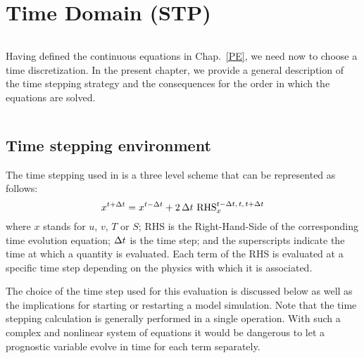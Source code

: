 \documentclass[NEMO_book]{subfiles}
\begin{document}
\chapter{Time Domain (STP) }
\label{STP}
\minitoc





\newpage
$\ $\newline    %


Having defined the continuous equations in Chap.~\ref{PE}, we need now to choose 
a time discretization. In the present chapter, we provide a general description of the \NEMO 
time stepping strategy and the consequences for the order in which the equations are
solved.

$\ $\newline    %
\section{Time stepping environment}
\label{STP_environment}

The time stepping used in \NEMO is a three level scheme that can be 
represented as follows:
\begin{equation} \label{Eq_STP}
   x^{t+\Delta t} = x^{t-\Delta t} + 2 \, \Delta t \  \text{RHS}_x^{t-\Delta t,\,t,\,t+\Delta t}
\end{equation} 
where $x$ stands for $u$, $v$, $T$ or $S$; RHS is the Right-Hand-Side of the 
corresponding time evolution equation; $\Delta t$ is the time step; and the 
superscripts indicate the time at which a quantity is evaluated. Each term of the 
RHS is evaluated at a specific time step depending on the physics with which 
it is associated. 

The choice of the time step used for this evaluation is discussed below as 
well as the implications for starting or restarting a model 
simulation. Note that the time stepping calculation is generally performed in a single 
operation. With such a complex and nonlinear system of equations it would be 
dangerous to let a prognostic variable evolve in time for each term separately.
\end{document}
